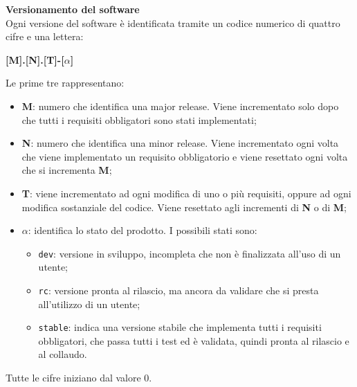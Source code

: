 \textbf{Versionamento del software}\\
Ogni versione del software è identificata tramite un codice numerico di quattro cifre e una lettera:
\begin{center}
\textbf{[M].[N].[T]-[$\alpha$]} 
\end{center}
Le prime tre rappresentano:
\begin{itemize}
	\item \textbf{M}: numero che identifica una major release. Viene incrementato solo dopo che tutti i requisiti obbligatori sono stati implementati;
  	\item \textbf{N}: numero che identifica una minor release. Viene incrementato ogni volta che viene implementato un requisito obbligatorio e viene resettato ogni volta che si incrementa \textbf{M};
  	\item \textbf{T}: viene incrementato ad ogni modifica di uno o più requisiti, oppure ad ogni modifica sostanziale del codice. Viene resettato agli incrementi di \textbf{N} o di \textbf{M};
  	\item \textbf{$\alpha$}: identifica lo stato del prodotto. I possibili stati sono:
  	\begin{itemize}
  		\item \texttt{dev}: versione in sviluppo, incompleta che non è finalizzata all'uso di un utente;
  		\item \texttt{rc}: versione pronta al rilascio, ma ancora da validare che si presta all'utilizzo di un utente; 
  		\item \texttt{stable}: indica una versione stabile che implementa tutti i requisiti obbligatori, che passa tutti i test ed è validata, quindi pronta al rilascio e al collaudo.  
	\end{itemize} 
\end{itemize}

Tutte le cifre iniziano dal valore 0. \\ 

